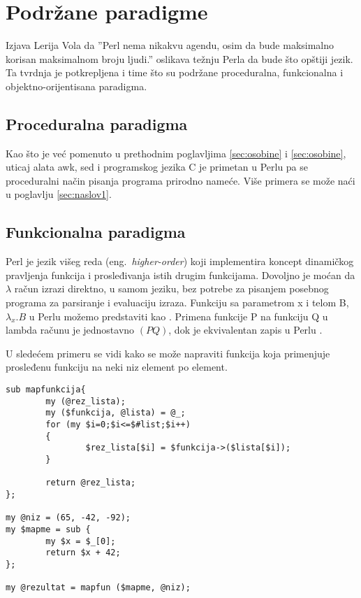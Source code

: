 \documentclass[a4paper]{article}
\begin{document}
\section{Podržane paradigme}

Izjava Lerija Vola da ''Perl nema nikakvu agendu, osim da bude maksimalno korisan maksimalnom broju ljudi.''\cite{walltalk} oslikava težnju Perla da bude što opštiji jezik. Ta tvrdnja je potkrepljena i time što su podržane proceduralna, funkcionalna i objektno-orijentisana paradigma. 

\subsection{Proceduralna paradigma}
Kao što je već pomenuto u prethodnim poglavljima \ref{sec:osobine} i \ref{sec:osobine}, uticaj alata awk, sed i programskog jezika C je primetan u Perlu pa se proceduralni način pisanja programa prirodno nameće. Više primera se može naći u poglavlju \ref{sec:naslov1}.

\subsection{Funkcionalna paradigma}

Perl je jezik višeg reda (eng.~{\em higher-order}) koji implementira koncept dinamičkog pravljenja funkcija i prosleđivanja istih drugim funkcijama. Dovoljno je moćan da $\lambda$ račun izrazi direktno, u samom jeziku, bez potrebe za pisanjem posebnog programa za parsiranje i evaluaciju izraza\cite{Liang:2004:PLC:1060081.1060106,comparing}. Funkciju sa parametrom x i telom B, $\lambda_x.B$ u Perlu možemo predstaviti kao . Primena funkcije P na funkciju Q u lambda računu je jednostavno $(P Q)$, dok je ekvivalentan zapis u Perlu .

U sledećem primeru se vidi kako se može napraviti funkcija koja primenjuje prosleđenu funkciju na neki niz element po element.

\begin{lstlisting}[caption={Funkcija mapiranja}, frame=single, label = mapfun]
sub mapfunkcija{
        my (@rez_lista);
        my ($funkcija, @lista) = @_;
        for (my $i=0;$i<=$#list;$i++)
        {
                $rez_lista[$i] = $funkcija->($lista[$i]);
        }

        return @rez_lista;
};

my @niz = (65, -42, -92);
my $mapme = sub {
        my $x = $_[0];
        return $x + 42;
};

my @rezultat = mapfun ($mapme, @niz);

\end{lstlisting}
\end{document}
